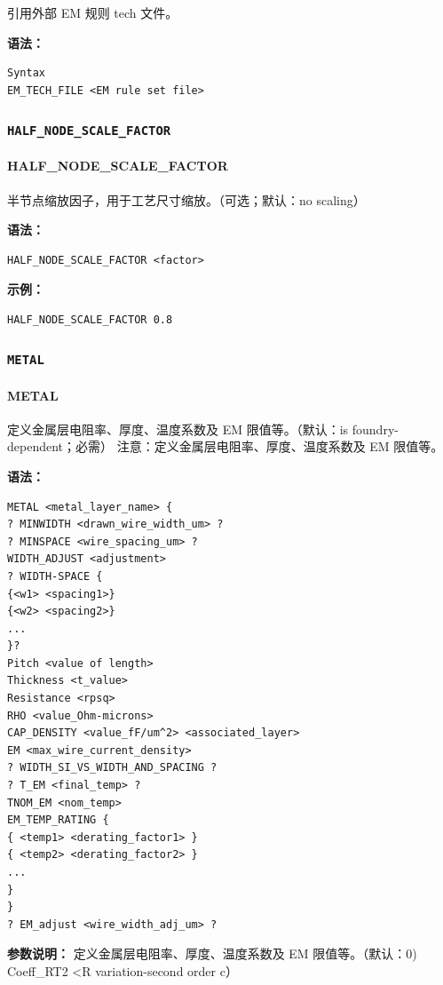引用外部 EM 规则 tech 文件。

\textbf{语法：}
\begin{lstlisting}
Syntax
EM_TECH_FILE <EM rule set file>
\end{lstlisting}

\subsubsection{\texttt{HALF_NODE_SCALE_FACTOR}}
\paragraph*{HALF_NODE_SCALE_FACTOR}

半节点缩放因子，用于工艺尺寸缩放。（可选；默认：no scaling）

\textbf{语法：}
\begin{lstlisting}
HALF_NODE_SCALE_FACTOR <factor>
\end{lstlisting}

\textbf{示例：}
\begin{lstlisting}
HALF_NODE_SCALE_FACTOR 0.8
\end{lstlisting}

\subsubsection{\texttt{METAL}}
\paragraph*{METAL}

定义金属层电阻率、厚度、温度系数及 EM 限值等。（默认：is foundry-dependent；必需） 注意：定义金属层电阻率、厚度、温度系数及 EM 限值等。

\textbf{语法：}
\begin{lstlisting}
METAL <metal_layer_name> {
? MINWIDTH <drawn_wire_width_um> ?
? MINSPACE <wire_spacing_um> ?
WIDTH_ADJUST <adjustment>
? WIDTH-SPACE {
{<w1> <spacing1>}
{<w2> <spacing2>}
...
}?
Pitch <value of length>
Thickness <t_value>
Resistance <rpsq>
RHO <value_Ohm-microns>
CAP_DENSITY <value_fF/um^2> <associated_layer>
EM <max_wire_current_density>
? WIDTH_SI_VS_WIDTH_AND_SPACING ?
? T_EM <final_temp> ?
TNOM_EM <nom_temp>
EM_TEMP_RATING {
{ <temp1> <derating_factor1> }
{ <temp2> <derating_factor2> }
...
}
}
? EM_adjust <wire_width_adj_um> ?
\end{lstlisting}

\textbf{参数说明：}
定义金属层电阻率、厚度、温度系数及 EM 限值等。（默认：0) Coeff\_RT2 <R variation-second order c）

